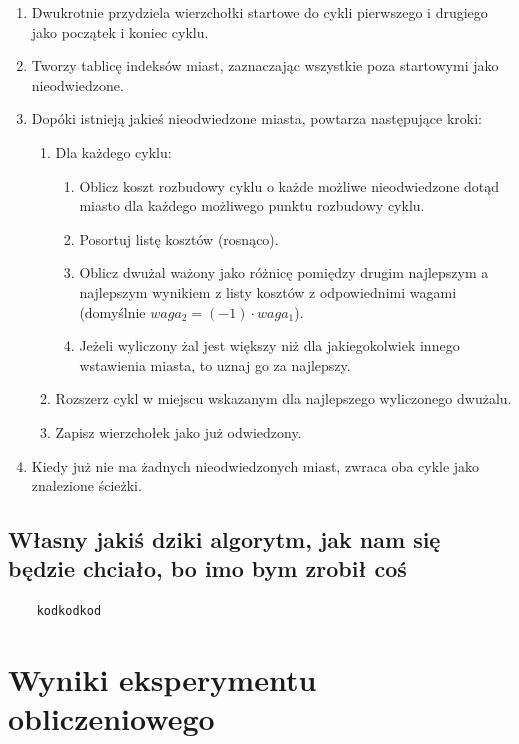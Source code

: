 \documentclass[11pt]{article}
\begin{document}
\begin{enumerate}
    \item Dwukrotnie przydziela wierzchołki startowe do cykli pierwszego i drugiego jako początek i koniec cyklu.
    \item Tworzy tablicę indeksów miast, zaznaczając wszystkie poza startowymi jako nieodwiedzone.
    \item Dopóki istnieją jakieś nieodwiedzone miasta, powtarza następujące kroki:
    \begin{enumerate}
        \item Dla każdego cyklu:
        \begin{enumerate}
            \item Oblicz koszt rozbudowy cyklu o każde możliwe nieodwiedzone dotąd miasto dla każdego możliwego punktu rozbudowy cyklu.
            \item Posortuj listę kosztów (rosnąco).
            \item Oblicz dwużal ważony jako różnicę pomiędzy drugim najlepszym a najlepszym wynikiem z listy kosztów z odpowiednimi wagami (domyślnie $waga_2 = (-1) \cdot waga_1$).
            \item Jeżeli wyliczony żal jest większy niż dla jakiegokolwiek innego wstawienia miasta, to uznaj go za najlepszy.
        \end{enumerate}
        \item Rozszerz cykl w miejscu wskazanym dla najlepszego wyliczonego dwużalu.
        \item Zapisz wierzchołek jako już odwiedzony.
    \end{enumerate}
    \item Kiedy już nie ma żadnych nieodwiedzonych miast, zwraca oba cykle jako znalezione ścieżki.
\end{enumerate}

\subsection{Własny jakiś dziki algorytm, jak nam się będzie chciało, bo imo bym zrobił coś}

\begin{verbatim}
    kodkodkod
\end{verbatim}


\section{Wyniki eksperymentu obliczeniowego}\label{sec:wyniki-eksperymenty-obliczeniowego}
\end{document}
